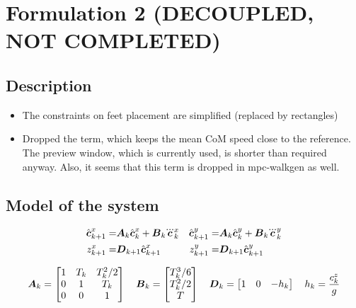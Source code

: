 \section{Formulation 2 (DECOUPLED, NOT COMPLETED)}\label{sec.form02}


\subsection{Description}
\begin{itemize}
    \item The constraints on feet placement are simplified (replaced by rectangles)
    \item Dropped the term, which keeps the mean CoM speed close to the reference. The preview window,
    which is currently used, is shorter than required anyway. Also, it seems that this term is dropped
    in mpc-walkgen as well.
\end{itemize}


\subsection{Model of the system}
\begin{align*}
\cstate_{k+1}^x =& \M{A}_k \cstate_k^x + \M{B}_k \cjerk_k^x
&\cstate_{k+1}^y =& \M{A}_k \cstate_k^y + \M{B}_k \cjerk_k^y\\
z_{k+1}^x =& \M{D}_{k+1} \cstate_{k+1}^x
&z_{k+1}^y =& \M{D}_{k+1} \cstate_{k+1}^y\\
\end{align*}

\begin{equation*}
\mbox{\boldmath $A$}_k = 
\begin{bmatrix}
    1       & T_k   & T_k^2/2   \\
    0       & 1     & T_k       \\
    0       & 0     & 1         \\
\end{bmatrix}
\quad
\mbox{\boldmath $B$}_k =
\begin{bmatrix}
    T_k^3/6 \\
    T_k^2/2 \\
    T       \\
\end{bmatrix}
\quad
\mbox{\boldmath $D$}_{k} = 
\begin{bmatrix}
    1       & 0     & -h_k  \\
\end{bmatrix}
\quad
h_k = \frac{c^z_k}{g}
\end{equation*}

